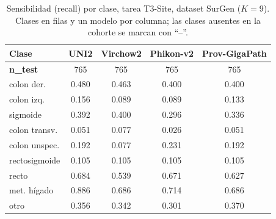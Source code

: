 \begin{table}[H]
\centering
\caption{Sensibilidad (recall) por clase, tarea T3-Site, dataset SurGen ($K=9$). Clases en filas y un modelo por columna; las clases ausentes en la cohorte se marcan con ``--''.}
\label{tab:anexo_site_sensibilidad_surgen}
\begin{tabular}{l c c c c}
\toprule
\textbf{Clase} & \textbf{UNI2} & \textbf{Virchow2} & \textbf{Phikon-v2} & \textbf{Prov-GigaPath} \\
\midrule
\textbf{n\_test} & 765 & 765 & 765 & 765 \\
colon der. & 0.480 & 0.463 & 0.400 & 0.400 \\
colon izq. & 0.156 & 0.089 & 0.089 & 0.133 \\
sigmoide & 0.392 & 0.400 & 0.296 & 0.336 \\
colon transv. & 0.051 & 0.077 & 0.026 & 0.051 \\
colon unspec. & 0.192 & 0.077 & 0.231 & 0.192 \\
rectosigmoide & 0.105 & 0.105 & 0.105 & 0.105 \\
recto & 0.684 & 0.539 & 0.671 & 0.627 \\
met. hígado & 0.886 & 0.686 & 0.714 & 0.686 \\
otro & 0.356 & 0.342 & 0.301 & 0.370 \\
\bottomrule
\end{tabular}
\end{table}

